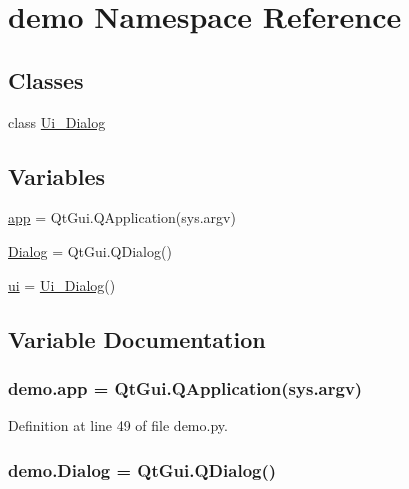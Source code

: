 \hypertarget{namespacedemo}{}\section{demo Namespace Reference}
\label{namespacedemo}
\subsection*{Classes}
\begin{DoxyCompactItemize}
\item 
class \hyperlink{classdemo_1_1_ui___dialog}{Ui\+\_\+\+Dialog}
\end{DoxyCompactItemize}
\subsection*{Variables}
\begin{DoxyCompactItemize}
\item 
\hyperlink{namespacedemo_a9c9d69cafdea7d88bc6bfd92ff78f2fa}{app} = Qt\+Gui.\+Q\+Application(sys.\+argv)
\item 
\hyperlink{namespacedemo_a8f7be6e690a527383cb1b696ba6bcb2e}{Dialog} = Qt\+Gui.\+Q\+Dialog()
\item 
\hyperlink{namespacedemo_a7c0d109adac145246119b1470b825e05}{ui} = \hyperlink{classdemo_1_1_ui___dialog}{Ui\+\_\+\+Dialog}()
\end{DoxyCompactItemize}


\subsection{Variable Documentation}
\subsubsection[{\texorpdfstring{app}{app}}]{\setlength{\rightskip}{0pt plus 5cm}demo.\+app = Qt\+Gui.\+Q\+Application(sys.\+argv)}\hypertarget{namespacedemo_a9c9d69cafdea7d88bc6bfd92ff78f2fa}{}\label{namespacedemo_a9c9d69cafdea7d88bc6bfd92ff78f2fa}


Definition at line 49 of file demo.\+py.

\subsubsection[{\texorpdfstring{Dialog}{Dialog}}]{\setlength{\rightskip}{0pt plus 5cm}demo.\+Dialog = Qt\+Gui.\+Q\+Dialog()}\hypertarget{namespacedemo_a8f7be6e690a527383cb1b696ba6bcb2e}{}\label{namespacedemo_a8f7be6e690a527383cb1b696ba6bcb2e}


